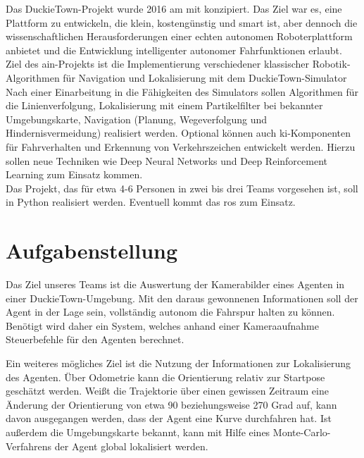 Das DuckieTown-Projekt wurde 2016 am \acf{mit} konzipiert. Das Ziel war es, eine Plattform zu
entwickeln, die klein, kostengünstig und \grqq smart\grqq{} ist, aber dennoch die wissenschaftlichen
Herausforderungen einer echten autonomen Roboterplattform anbietet und die Entwicklung
intelligenter autonomer Fahrfunktionen erlaubt. \cite{duckietown}\\

\noindent Ziel des \acs{ain}-Projekts ist die Implementierung verschiedener klassischer Robotik-Algorithmen
für Navigation und Lokalisierung mit dem DuckieTown-Simulator\\

\noindent Nach einer Einarbeitung in die Fähigkeiten des Simulators sollen Algorithmen für die
Linienverfolgung, Lokalisierung mit einem Partikelfilter bei bekannter Umgebungskarte,
Navigation (Planung, Wegeverfolgung und Hindernisvermeidung) realisiert werden. Optional können auch \acs{ki}-Komponenten für
Fahrverhalten und Erkennung von Verkehrszeichen entwickelt werden. Hierzu sollen neue
Techniken wie Deep Neural Networks und Deep Reinforcement Learning zum Einsatz
kommen.\\

\noindent Das Projekt, das für etwa 4-6 Personen in zwei bis drei Teams vorgesehen ist, soll in Python realisiert werden.
Eventuell kommt das \acf{ros} zum Einsatz.

\newpage

\section{Aufgabenstellung}

Das Ziel unseres Teams ist die Auswertung der Kamerabilder eines Agenten in einer DuckieTown-Umgebung. Mit den daraus gewonnenen Informationen soll der Agent in der Lage sein, vollständig autonom die Fahrspur halten zu können. Benötigt wird daher ein System, welches anhand einer Kameraaufnahme Steuerbefehle für den Agenten berechnet.

Ein weiteres mögliches Ziel ist die Nutzung der Informationen zur Lokalisierung des Agenten. Über Odometrie kann die Orientierung relativ zur Startpose geschätzt werden. Weißt die Trajektorie über einen gewissen Zeitraum eine Änderung der Orientierung von etwa 90 beziehungsweise 270 Grad auf, kann davon ausgegangen werden, dass der Agent eine Kurve durchfahren hat. Ist außerdem die Umgebungskarte bekannt, kann mit Hilfe eines Monte-Carlo-Verfahrens der Agent global lokalisiert werden.\\

